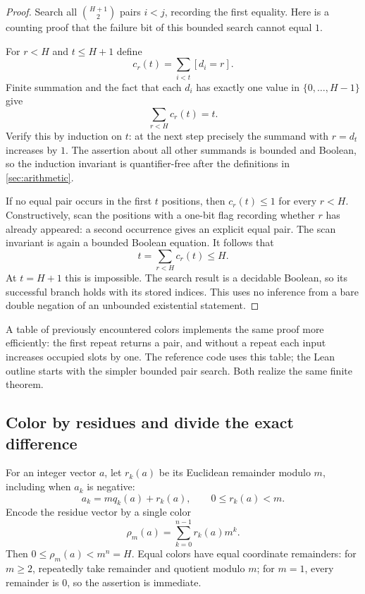 \begin{proof}
Search all \(\binom{H+1}{2}\) pairs \(i<j\), recording the first
equality. Here is a counting proof that the failure bit of this
bounded search cannot equal \(1\).

For \(r<H\) and \(t\leq H+1\) define
\[
                   c_r(t)=\sum_{i<t}[d_i=r].
\]
Finite summation and the fact that each \(d_i\) has exactly one
value in \(\{0,\ldots,H-1\}\) give
\begin{equation}\label{eq:count-conserve}
                     \sum_{r<H}c_r(t)=t.
\end{equation}
Verify this by induction on \(t\): at the next step precisely
the summand with \(r=d_t\) increases by \(1\).
The assertion about all other summands is bounded and Boolean,
so the induction invariant is quantifier-free after the
definitions in \cref{sec:arithmetic}.

If no equal pair occurs in the first \(t\) positions, then
\(c_r(t)\leq1\) for every \(r<H\). Constructively, scan the
positions with a one-bit flag recording whether \(r\) has
already appeared: a second occurrence gives an explicit
equal pair. The scan invariant is again a bounded Boolean
equation. It follows that
\[
                    t=\sum_{r<H}c_r(t)\leq H.
\]
At \(t=H+1\) this is impossible. The search result is a
decidable Boolean, so its successful branch holds with its
stored indices. This uses no inference from a bare double
negation of an unbounded existential statement.
\end{proof}

A table of previously encountered colors implements the same proof
more efficiently: the first repeat returns a pair, and without
a repeat each input increases occupied slots by one.
The reference code uses this table; the Lean outline starts with
the simpler bounded pair search. Both realize the same finite
theorem.

\subsection{Color by residues and divide the exact difference}

For an integer vector \(a\), let \(r_k(a)\) be its Euclidean
remainder modulo \(m\), including when \(a_k\) is negative:
\[
             a_k=mq_k(a)+r_k(a),\qquad 0\leq r_k(a)<m.
\]
Encode the residue vector by a single color
\[
                 \rho_m(a)=\sum_{k=0}^{n-1}r_k(a)m^k.
\]
Then \(0\leq\rho_m(a)<m^n=H\).
Equal colors have equal coordinate remainders: for \(m\geq2\),
repeatedly take remainder and quotient modulo \(m\); for \(m=1\),
every remainder is \(0\), so the assertion is immediate.

